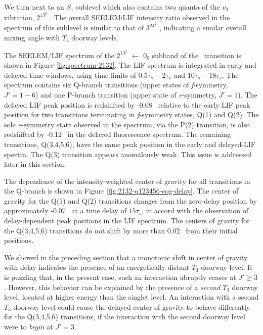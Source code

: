 
We turn next to an $S_1$ sublevel which also contains two quanta of
the $\nu_3$ vibration, $2^13^2$ .  The overall SEELEM:LIF
intensity ratio observed in the spectrum of this sublevel is similar
to that of $3^24^2$ , indicating a similar overall mixing angle
with $T_3$ doorway levels.

The SEELEM/LIF spectrum of the $2^13^2$  $\leftarrow$ $0_0$
subband of the \AtoX\ transition is shown in Figure
\ref{fig:spectrum-2132}.  The LIF spectrum is integrated in early and
delayed time windows, using time limits of $0.5\tau_s-2\tau_s$ and
$10\tau_s-18\tau_s$.  The spectrum contains six Q-branch transitions
(upper states of \emph{f}-symmetry, $J'=1-6$) and one P-branch
transition (upper state of \emph{e}-symmetry, $J'=1$).  The delayed
LIF peak position is redshifted by -0.08 \rcm\ relative to the early
LIF peak position for two transitions terminating in \emph{f}-symmetry
states, Q(1) and Q(2).  The sole \emph{e}-symmetry state observed in
the spectrum, via the P(2) transition, is also redshifted by -0.12
\rcm\ in the delayed fluorescence spectrum.  The remaining
transitions, Q(3,4,5,6), have the same peak position in the early and
delayed-LIF spectra.  The Q(3) transition appears anomalously weak.
This issue is addressed later in this section.

The dependence of the intensity-weighted center of gravity for all
transitions in the Q-branch is shown in Figure
\ref{fig:2132-q123456-cog-delay}.  The center of gravity for the Q(1)
and Q(2) transitions changes from the zero-delay position by
approximately -0.07 \rcm\ at a time delay of $15\tau_s$, in accord
with the observation of delay-dependent peak positions in the LIF
spectrum.  The centers of gravity for the Q(3,4,5,6) transitions do
not shift by more than 0.02 \rcm\ from their initial positions.

We showed in the preceding section that a monotonic shift in center of
gravity with delay indicates the presence of an energetically distant
$T_3$ doorway level.  It is puzzling that, in the present case, such
an interaction abruptly ceases at $J' \geq 3$.  However, this behavior
can be explained by the presence of a \emph{second} $T_3$ doorway
level, located at higher energy than the singlet level.  An
interaction with a second $T_3$ doorway level could cause the delayed
center of gravity to behave differently for the Q(3,4,5,6)
transitions, if the interaction with the second doorway level were to
\emph{begin} at $J'=3$.

